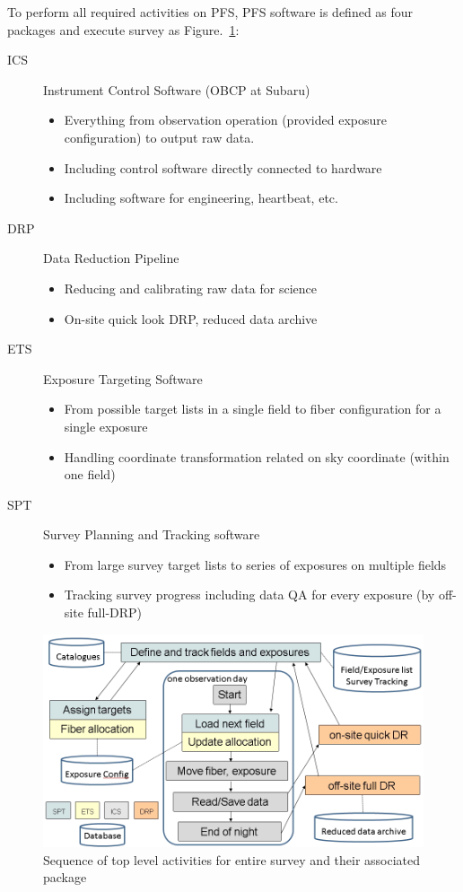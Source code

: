 \documentclass[a4paper,notitlepage]{article}
\begin{document}
To perform all required activities on PFS, PFS software is defined as 
four packages and execute survey as
Figure.~\ref{fig:sciops-scireq-slide-softcoord}: 
\begin{description}
  \item[ICS] Instrument Control Software (OBCP at Subaru)
    \begin{itemize}
      \item Everything from observation operation (provided exposure configuration) to output raw data.
      \item Including control software directly connected to hardware
      \item Including software for engineering, heartbeat, etc.
    \end{itemize}
  \item[DRP] Data Reduction Pipeline
    \begin{itemize}
      \item Reducing and calibrating raw data for science
      \item On-site quick look DRP, reduced data archive
    \end{itemize}
  \item[ETS] Exposure Targeting Software
    \begin{itemize}
      \item From possible target lists in a single field to fiber configuration for a single exposure
      \item Handling coordinate transformation related on sky coordinate (within one field)
    \end{itemize}
  \item[SPT] Survey Planning and Tracking software
    \begin{itemize}
      \item From large survey target lists to series of exposures on multiple fields
      \item Tracking survey progress including data QA for every exposure (by off-site full-DRP)
    \end{itemize}
\end{description}


\begin{figure}[htb]
  \begin{center}
    \includegraphics[width=.75\linewidth]{sciops-scireq-slide-softcoord.png}
  \end{center}
  \caption{Sequence of top level activities for entire survey and 
    their associated package}
  \label{fig:sciops-scireq-slide-softcoord}
\end{figure}
\end{document}
